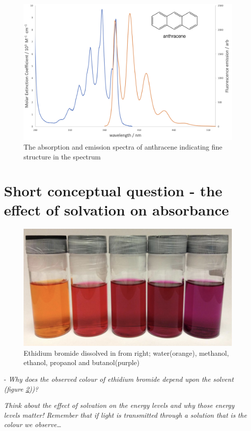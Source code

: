 \documentclass[
]{book}
\begin{document}
\begin{figure}

{\centering \includegraphics[width=0.7\linewidth]{images/anthracene} 

}

\caption{The absorption and emission spectra of anthracene indicating fine structure in the spectrum}\label{fig:anthracene}
\end{figure}

\hypertarget{sec:solvationabs}{%
\section{Short conceptual question - the effect of solvation on absorbance}\label{sec:solvationabs}}

\begin{figure}

{\centering \includegraphics[width=0.7\linewidth]{images/ethidium} 

}

\caption{Ethidium bromide dissolved in from right; water(orange), methanol, ethanol, propanol and butanol(purple)}\label{fig:ethidium}
\end{figure}

- \emph{Why does the observed colour of ethidium bromide depend upon the solvent (figure \ref{fig:ethidium}))?}

\emph{Think about the effect of solvation on the energy levels and why those energy levels matter! Remember that if light is transmitted through a solution that is the colour we observe\ldots{}}
\end{document}
